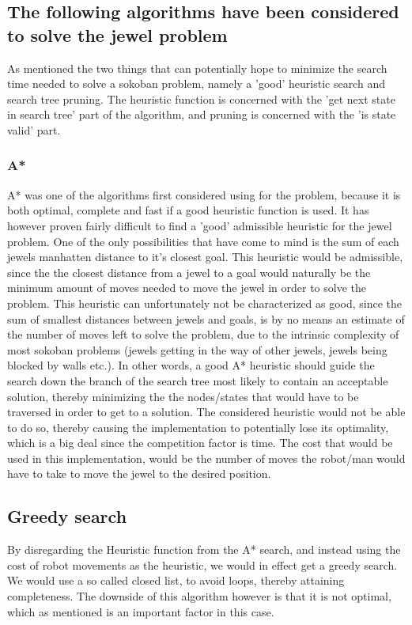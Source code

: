 \subsection*{The following algorithms have been considered to solve the jewel problem}
As mentioned the two things that can potentially hope to minimize the search time needed to solve a sokoban problem, namely a 'good' heuristic search and search tree pruning. The heuristic function is concerned with the 'get next state in search tree' part of the algorithm, and pruning is concerned with the 'is state valid' part.

\subsubsection*{A*}
A* was one of the algorithms first considered using for the problem, because it is both optimal, complete and fast if a good heuristic function is used.
It has however proven fairly difficult to find a 'good' admissible heuristic for the jewel problem. One of the only possibilities that have come to mind is the sum of each jewels manhatten distance to it's closest goal. This heuristic would be admissible, since the the closest distance from a jewel to a goal would naturally be the minimum amount of moves needed to move the jewel in order to solve the problem. This heuristic can unfortunately not be characterized as good, since the sum of smallest distances between jewels and goals, is by no means an estimate of the number of moves left to solve the problem, due to the intrinsic complexity of most sokoban problems (jewels getting in the way of other jewels, jewels being blocked by walls etc.). In other words, a good A* heuristic should guide the search down the branch of the search tree most likely to contain an acceptable solution, thereby minimizing the the nodes/states that would have to be traversed in order to get to a solution. The considered heuristic would not be able to do so, thereby causing the implementation to potentially lose its optimality, which is a big deal since the competition factor is time. 
The cost that would be used in this implementation, would be the number of moves the robot/man would have to take to move the jewel to the desired position.

\subsection*{Greedy search}
By disregarding the Heuristic function from the A* search, and instead using the cost of robot movements as the heuristic, we would in effect get a greedy search. We would use a so called closed list, to avoid loops, thereby attaining completeness. The downside of this algorithm however is that it is not optimal, which as mentioned is an important factor in this case.

